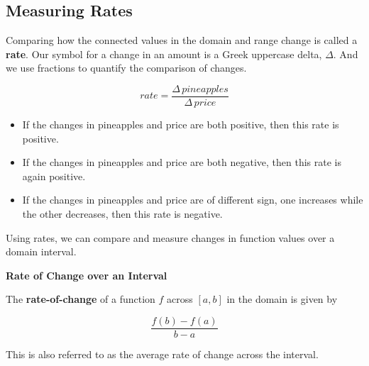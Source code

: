\documentclass{ximera}
\begin{document}
\subsection*{Measuring Rates}

Comparing how the connected values in the domain and range change is called a \textbf{rate}. Our symbol for a change in an amount is a Greek uppercase delta, $\Delta$.  And we use fractions to quantify the comparison of changes.

\[ rate = \frac{\Delta \, pineapples}{\Delta \, price}\]




\begin{itemize}
\item If the changes in pineapples and price are both positive, then this rate is positive.
\item If the changes in pineapples and price are both negative, then this rate is again positive.
\item If the changes in pineapples and price are of different sign, one increases while the other decreases, then this rate is negative.
\end{itemize}


Using rates, we can compare and measure changes in function values over a domain interval.


\begin{definition}  \textbf{\textcolor{green!50!black}{Rate of Change over an Interval}} 

The \textbf{rate-of-change} of a function $f$ across $[a, b]$ in the domain is given by

\[  \frac{f(b) - f(a)}{b - a}  \]



This is also referred to as the average rate of change across the interval.

\end{definition}
\end{document}
